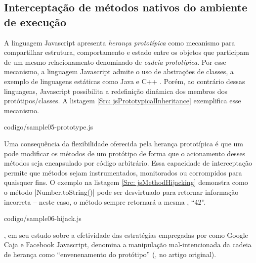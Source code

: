 \subsection{Interceptação de métodos nativos do ambiente de execução}

A linguagem Javascript apresenta \textit{herança prototípica} como mecanismo para compartilhar estrutura, comportamento e estado entre os objetos que participam de um mesmo relacionamento denominado de \textit{cadeia prototípica}. Por esse mecanismo, a linguagem Javascript admite o uso de abstrações de classes, a exemplo de linguagens estáticas como Java e C++ \cite{ECMA2017}. Porém, ao contrário dessas linguagens, Javascript possibilita a redefinição dinâmica dos membros dos protótipos/classes. A listagem \ref{Src: jsPrototypicalInheritance} exemplifica esse mecanismo.



	{codigo/sample05-prototype.js}

Uma consequência da flexibilidade oferecida pela herança prototípica é que um {\script} pode modificar os métodos de um protótipo de forma que o acionamento desses métodos seja encapsulado por código arbitrário. Essa capacidade de interceptação permite que métodos sejam instrumentados, monitorados ou corrompidos para quaisquer fins. O exemplo na listagem \ref{Src: jsMethodHijacking} demonstra como o método |Number.toString()| pode ser desvirtuado para retornar informação incorreta -- neste caso, o método sempre retornará a mesma , ``42''.


	{codigo/sample06-hijack.js}

, em seu estudo sobre a efetividade das estratégias empregadas por  como Google Caja e Facebook Javascript, denomina a manipulação mal-intencionada da cadeia de herança como ``envenenamento do protótipo'' (, no artigo original).